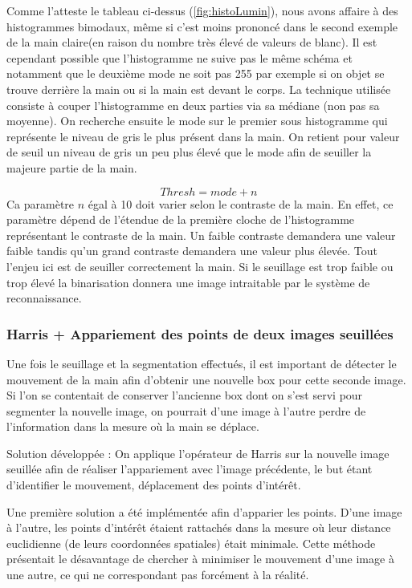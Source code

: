 Comme l’atteste le tableau ci-dessus (\autoref{fig:histoLumin}), nous avons affaire à des histogrammes bimodaux, même si c’est moins prononcé dans le second exemple de la main claire(en raison du nombre très élevé de valeurs de blanc). Il est cependant possible que l’histogramme ne suive pas le même schéma  et notamment que le deuxième mode ne soit pas 255 par exemple si on objet se trouve derrière la main ou si la main est devant le corps.
	La technique utilisée consiste à couper l’histogramme en deux parties via sa médiane (non pas sa moyenne). On recherche ensuite le mode sur le premier sous histogramme qui représente le niveau de gris le plus présent dans la main. On retient pour valeur de seuil un niveau de gris un peu plus élevé que le mode afin de seuiller la majeure partie de la main.

\[
Thresh = mode + n
\]
	Ca paramètre $n$ égal à 10 doit varier selon le contraste de la main. En effet, ce paramètre dépend de l’étendue de la première cloche de l’histogramme représentant le contraste de la main. Un faible contraste demandera une valeur faible tandis qu’un grand contraste demandera une valeur plus élevée. Tout l’enjeu ici est de seuiller correctement la main. Si le seuillage est trop faible ou trop élevé la binarisation donnera une image intraitable par le système de reconnaissance.

\subsubsection{Harris + Appariement des points de deux images seuillées}

Une fois le seuillage et la segmentation effectués, il est important de détecter le mouvement de la main afin d’obtenir une nouvelle box pour cette seconde image. Si l’on se contentait de conserver l’ancienne box dont on s’est servi pour segmenter la nouvelle image, on pourrait d’une image à l’autre perdre de l’information dans la mesure où la main se déplace.

	Solution développée : On applique l’opérateur de Harris sur la nouvelle image seuillée afin de réaliser l’appariement avec l’image précédente, le but étant d’identifier le mouvement, déplacement des points d’intérêt.

	Une première solution a été implémentée afin d’apparier les points. D’une image à l’autre, les points d’intérêt étaient rattachés dans la mesure où leur distance euclidienne (de leurs coordonnées spatiales) était minimale. Cette méthode présentait le désavantage de chercher à minimiser le mouvement d’une image à une autre, ce qui ne correspondant pas forcément à la réalité.

